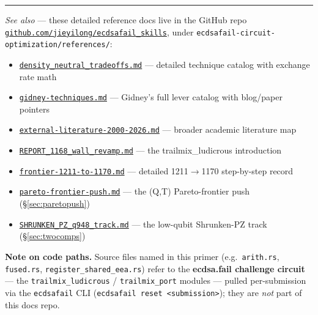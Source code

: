 \documentclass[11pt,a4paper]{article}
\begin{document}
\vfill
\noindent\rule{\textwidth}{0.4pt}
\vspace{2pt}

\noindent\textit{See also} --- these detailed reference docs live in the GitHub repo
\href{https://github.com/jieyilong/ecdsafail_skills}{\texttt{github.com/jieyilong/ecdsafail\_skills}},
under \texttt{ecdsafail-circuit-optimization/references/}:
\begin{itemize}\small
  \item \href{https://github.com/jieyilong/ecdsafail_skills/blob/main/ecdsafail-circuit-optimization/references/density_neutral_tradeoffs.md}{\texttt{density\_neutral\_tradeoffs.md}} --- detailed technique catalog with exchange rate math
  \item \href{https://github.com/jieyilong/ecdsafail_skills/blob/main/ecdsafail-circuit-optimization/references/gidney-techniques.md}{\texttt{gidney-techniques.md}} --- Gidney's full lever catalog with blog/paper pointers
  \item \href{https://github.com/jieyilong/ecdsafail_skills/blob/main/ecdsafail-circuit-optimization/references/external-literature-2000-2026.md}{\texttt{external-literature-2000-2026.md}} --- broader academic literature map
  \item \href{https://github.com/jieyilong/ecdsafail_skills/blob/main/ecdsafail-circuit-optimization/references/REPORT_1168_wall_revamp.md}{\texttt{REPORT\_1168\_wall\_revamp.md}} --- the trailmix\_ludicrous introduction
  \item \href{https://github.com/jieyilong/ecdsafail_skills/blob/main/ecdsafail-circuit-optimization/references/frontier-1211-to-1170.md}{\texttt{frontier-1211-to-1170.md}} --- detailed 1211$\to$1170 step-by-step record
  \item \href{https://github.com/jieyilong/ecdsafail_skills/blob/main/ecdsafail-circuit-optimization/references/pareto-frontier-push.md}{\texttt{pareto-frontier-push.md}} --- the (Q,T) Pareto-frontier push (\S\ref{sec:paretopush})
  \item \href{https://github.com/jieyilong/ecdsafail_skills/blob/main/ecdsafail-circuit-optimization/references/SHRUNKEN_PZ_q948_track.md}{\texttt{SHRUNKEN\_PZ\_q948\_track.md}} --- the low-qubit Shrunken-PZ track (\S\ref{sec:twocomps})
\end{itemize}

\vspace{4pt}
\noindent\textbf{Note on code paths.} Source files named in this primer (e.g.\ \texttt{arith.rs},
\texttt{fused.rs}, \texttt{register\_shared\_eea.rs}) refer to the \textbf{ecdsa.fail challenge
circuit} --- the \texttt{trailmix\_ludicrous} / \texttt{trailmix\_port} modules --- pulled
per-submission via the \texttt{ecdsafail} CLI (\texttt{ecdsafail reset <submission>}); they are
\emph{not} part of this docs repo.
\end{document}
